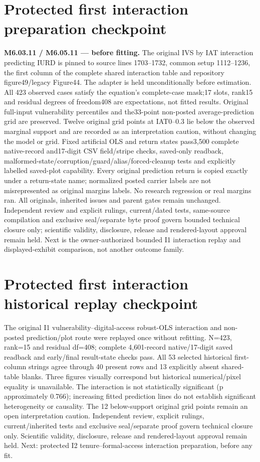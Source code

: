 \documentclass[11pt,a4paper]{article}
\begin{document}
\section*{Protected first interaction preparation checkpoint}
\noindent\textbf{M6.03.11 / M6.05.11 --- before fitting.} The original IVS by IAT interaction predicting IURD is pinned to source lines 1703--1732, common setup 1112--1236, the first column of the complete shared interaction table and repository figure49/legacy Figure44. The adapter is held unconditionally before estimation. All 423 observed cases satisfy the equation's complete-case mask;17 slots, rank15 and residual degrees of freedom408 are expectations, not fitted results. Original full-input vulnerability percentiles and the33-point non-posted average-prediction grid are preserved. Twelve original grid points at IAT0--0.3 lie below the observed marginal support and are recorded as an interpretation caution, without changing the model or grid. Fixed artificial OLS and return states pass3,500 complete native-record and17-digit CSV field/stripe checks, saved-only readback, malformed-state/corruption/guard/alias/forced-cleanup tests and explicitly labelled saved-plot capability. Every original prediction return is copied exactly under a return-state name; normalized posted carrier labels are not misrepresented as original margins labels. No research regression or real margins ran. All originals, inherited issues and parent gates remain unchanged. Independent review and explicit rulings, current/dated tests, same-source compilation and exclusive seal/separate byte proof govern bounded technical closure only; scientific validity, disclosure, release and rendered-layout approval remain held. Next is the owner-authorized bounded I1 interaction replay and displayed-exhibit comparison, not another outcome family.
\section*{Protected first interaction historical replay checkpoint}
\noindent The original I1 vulnerability--digital-access robust-OLS interaction and non-posted prediction/plot route were replayed once without refitting. N=423, rank=15 and residual df=408; complete 4,601-record native/17-digit saved readback and early/final result-state checks pass. All 53 selected historical first-column strings agree through 40 present rows and 13 explicitly absent shared-table blanks. Three figures visually correspond but historical numerical/pixel equality is unavailable. The interaction is not statistically significant (p approximately 0.766); increasing fitted prediction lines do not establish significant heterogeneity or causality. The 12 below-support original grid points remain an open interpretation caution. Independent review, explicit rulings, current/inherited tests and exclusive seal/separate proof govern technical closure only. Scientific validity, disclosure, release and rendered-layout approval remain held. Next: protected I2 tenure--formal-access interaction preparation, before any fit.
\end{document}
